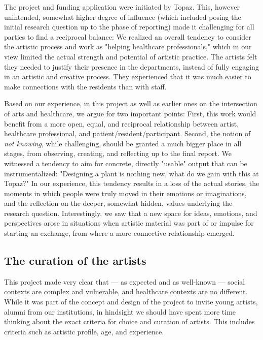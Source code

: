 \documentclass[authordate, empirical]{jote-new-article}
\begin{document}
	
	{



	The project and funding application were initiated by Topaz. This, however unintended, somewhat higher degree of influence (which included posing the initial research question up to the phase of reporting) made it challenging for all parties to find a reciprocal balance: We realized an overall tendency to consider the artistic process and work as "helping healthcare professionals," which in our view limited the actual strength and potential of artistic practice. The artists felt they needed to justify their presence in the departments, instead of fully engaging in an artistic and creative process. They experienced that it was much easier to make connections with the residents than with staff.







	Based on our experience, in this project as well as earlier ones on the intersection of arts and healthcare, we argue for two important points: First, this work would benefit from a more open, equal, and reciprocal relationship between artist, healthcare professional, and patient/resident/participant. Second, the notion of \emph{not knowing}, while challenging, should be granted a much bigger place in all stages, from observing, creating, and reflecting up to the final report. We witnessed a tendency to aim for concrete, directly "usable" output that can be instrumentalized: "Designing a plant is nothing new, what do we gain with this at Topaz?" In our experience, this tendency results in a loss of the actual stories, the moments in which people were truly moved in their emotions or imaginations, and the reflection on the deeper, somewhat hidden, values underlying the research question. Interestingly, we saw that a new space for ideas, emotions, and perspectives arose in situations when artistic material was part of or impulse for starting an exchange, from where a more connective relationship emerged.



	\subsection{The curation of the artists}

	

	This project made very clear that --- as expected and as well-known --- social contexts are complex and vulnerable, and healthcare contexts are no different. While it was part of the concept and design of the project to invite young artists, alumni from our institutions, in hindsight we should have spent more time thinking about the exact criteria for choice and curation of artists. This includes criteria such as artistic profile, age, and experience.



}
\end{document}
